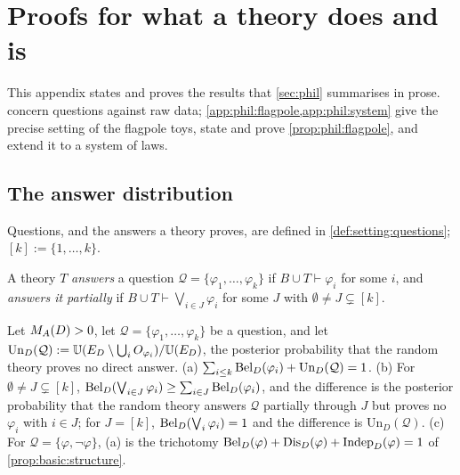\section{Proofs for what a theory does and is}\label{app:phil}

This appendix states and proves the results that \cref{sec:phil} summarises in prose.  concern questions against raw data; \cref{app:phil:flagpole,app:phil:system} give the precise setting of the flagpole toys, state and prove \cref{prop:phil:flagpole}, and extend it to a system of laws.

\subsection{The answer distribution}\label{app:phil:answers}

Questions, and the answers a theory proves, are defined in \cref{def:setting:questions}; $[k]:=\{1,\dots,k\}$.

\begin{definition}[Answers]\label{def:phil:questions}
A theory $T$ \emph{answers} a question $\mathcal Q=\{\varphi_1,\dots,\varphi_k\}$ if $B\cup T\vdash\varphi_i$ for some $i$, and \emph{answers it partially} if $B\cup T\vdash\bigvee_{i\in J}\varphi_i$ for some $J$ with $\emptyset\ne J\subsetneq[k]$.
\end{definition}

\begin{proposition}\label{prop:phil:answers}
Let $M_{A}(D)>0$, let $\mathcal Q=\{\varphi_1,\dots,\varphi_k\}$ be a question, and let $\mathrm{Un}_D(\mathcal Q):=\mathbb{U}(E_D\setminus\bigcup_iO_{\varphi_i})/\mathbb{U}(E_D)$, the posterior probability that the random theory proves no direct answer. (a) $\sum_{i\le k}\mathrm{Bel}_D(\varphi_i)+\mathrm{Un}_D(\mathcal Q)=1$. (b) For $\emptyset\ne J\subsetneq[k]$, $\mathrm{Bel}_D(\bigvee_{i\in J}\varphi_i)\ge\sum_{i\in J}\mathrm{Bel}_D(\varphi_i)$, and the difference is the posterior probability that the random theory answers $\mathcal Q$ partially through $J$ but proves no $\varphi_i$ with $i\in J$; for $J=[k]$, $\mathrm{Bel}_D(\bigvee_i\varphi_i)=1$ and the difference is $\mathrm{Un}_D(\mathcal Q)$. (c) For $\mathcal Q=\{\varphi,\neg\varphi\}$, (a) is the trichotomy $\mathrm{Bel}_D(\varphi)+\mathrm{Dis}_D(\varphi)+\mathrm{Indep}_D(\varphi)=1$ of \cref{prop:basic:structure}.
\end{proposition}

